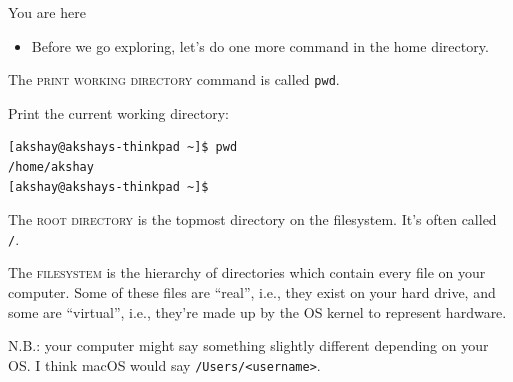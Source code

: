 \begin{frame}[fragile]{You are here}
  \begin{itemize}
    \item
      Before we go exploring, let's do one more command in the home directory.
  \end{itemize}
  \pause
  \alert<2>{The \textsc{print working directory} command is called \texttt{pwd}.}
  \pause
  \begin{example}[pwd]
    Print the current working directory:
    \begin{verbatim}
[akshay@akshays-thinkpad ~]$ pwd
/home/akshay
[akshay@akshays-thinkpad ~]$ 
    \end{verbatim}
  \end{example}
  \pause

  \begin{definition}
    The \textsc{root directory} is the topmost directory on the filesystem.  It's often called \texttt{/}.
  \end{definition}

   {
    \begin{definition}[filesystem]
      The \textsc{filesystem} is the hierarchy of directories which contain
      every file on your computer.  Some of these files are \enquote{real},
      i.e., they exist on your hard drive, and some are \enquote{virtual},
      i.e., they're made up by the OS kernel to represent hardware.
    \end{definition}
    N.B.: your computer might say something slightly different depending on
    your OS.  I think macOS would say \texttt{/Users/<username>}.
  }
\end{frame}

